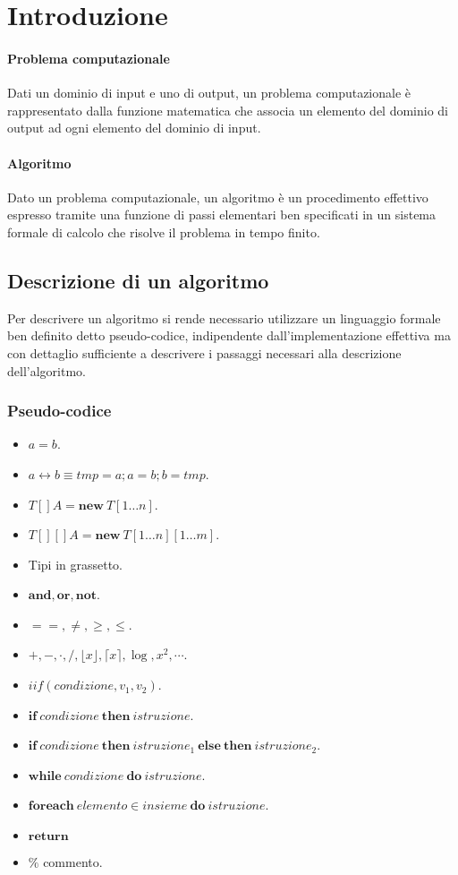 \chapter{Introduzione}
\subsubsection{Problema computazionale}
Dati un dominio di input e uno di output, un problema computazionale \`e rappresentato dalla funzione matematica che associa un elemento del dominio di
output ad ogni elemento del dominio di input.
\subsubsection{Algoritmo}
Dato un problema computazionale, un algoritmo \`e un procedimento effettivo espresso tramite una funzione di passi elementari ben specificati in un sistema
formale di calcolo che risolve il problema in tempo finito.
\section{Descrizione di un algoritmo}
Per descrivere un algoritmo si rende necessario utilizzare un linguaggio formale ben definito detto pseudo-codice, indipendente dall'implementazione 
effettiva ma con dettaglio sufficiente a descrivere i passaggi necessari alla descrizione dell'algoritmo.
\subsection{Pseudo-codice}
\begin{itemize}
\item $a=b$.
\item $a\leftrightarrow b\equiv tmp=a; a=b; b=tmp$.
\item $T[] A=\mathbf{new}\ T[1\dots n]$.
\item $T[][] A=\mathbf{new}\ T[1\dots n][1\dots m]$.
\item Tipi in grassetto.
\item $\mathbf{and, or, not}$.
\item $==, \neq, \ge, \le$.
\item $+,-,\cdot, /, \lfloor x\rfloor, \lceil x\rceil, \log, x^2,\cdots$.
\item $iif(condizione, v_1,v_2)$.
\item $\mathbf{if}\ condizione\ \mathbf{then}\ istruzione$.
\item $\mathbf{if}\ condizione\ \mathbf{then}\ istruzione_1\ \mathbf{else}\ \mathbf{then}\ istruzione_2$.
\item $\mathbf{while}\ condizione\ \mathbf{do}\ istruzione$.
\item $\mathbf{foreach}\ elemento\in insieme\ \mathbf{do}\ istruzione$.
\item $\mathbf{return}$
\item $\%$ commento.
\end{itemize}
